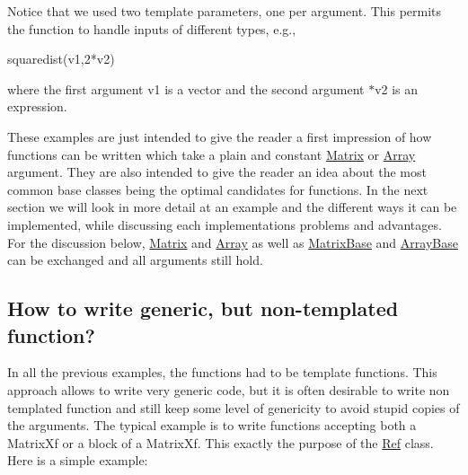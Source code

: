  Notice that we used two template parameters, one per argument. This permits the function to handle inputs of different types, e.\+g., 
\begin{DoxyCode}
squaredist(v1,2*v2)
\end{DoxyCode}
 where the first argument {\ttfamily v1} is a vector and the second argument {$\ast$v2} is an expression. ~\newline
~\newline


These examples are just intended to give the reader a first impression of how functions can be written which take a plain and constant \hyperlink{group___core___module_class_eigen_1_1_matrix}{Matrix} or \hyperlink{group___core___module_class_eigen_1_1_array}{Array} argument. They are also intended to give the reader an idea about the most common base classes being the optimal candidates for functions. In the next section we will look in more detail at an example and the different ways it can be implemented, while discussing each implementation\textquotesingle{}s problems and advantages. For the discussion below, \hyperlink{group___core___module_class_eigen_1_1_matrix}{Matrix} and \hyperlink{group___core___module_class_eigen_1_1_array}{Array} as well as \hyperlink{group___core___module_class_eigen_1_1_matrix_base}{Matrix\+Base} and \hyperlink{group___core___module_class_eigen_1_1_array_base}{Array\+Base} can be exchanged and all arguments still hold.\hypertarget{_topic_function_taking_eigen_types_TopicUsingRefClass}{}\subsection{How to write generic, but non-\/templated function?}\label{_topic_function_taking_eigen_types_TopicUsingRefClass}
In all the previous examples, the functions had to be template functions. This approach allows to write very generic code, but it is often desirable to write non templated function and still keep some level of genericity to avoid stupid copies of the arguments. The typical example is to write functions accepting both a Matrix\+Xf or a block of a Matrix\+Xf. This exactly the purpose of the \hyperlink{group___core___module_class_eigen_1_1_ref}{Ref} class. Here is a simple example\+:

